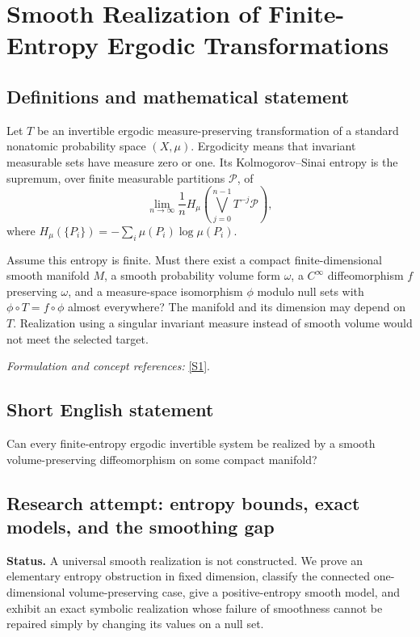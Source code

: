 \documentclass[11pt]{article}
\begin{document}
\section*{\texorpdfstring{Smooth Realization of Finite-Entropy Ergodic Transformations}{Smooth Realization of Finite-Entropy Ergodic Transformations}}\label{455}
\subsection{Definitions and mathematical statement}
Let $T$ be an invertible ergodic measure-preserving transformation of a standard nonatomic probability space $(X,\mu)$. Ergodicity means that invariant measurable sets have measure zero or one. Its Kolmogorov--Sinai entropy is the supremum, over finite measurable partitions $\mathcal P$, of
\[
 \lim_{n\to\infty}\frac1n
 H_\mu\!\left(\bigvee_{j=0}^{n-1}T^{-j}\mathcal P\right),
\]
where $H_\mu(\{P_i\})=-\sum_i\mu(P_i)\log\mu(P_i)$.

Assume this entropy is finite. Must there exist a compact finite-dimensional smooth manifold $M$, a smooth probability volume form $\omega$, a $C^\infty$ diffeomorphism $f$ preserving $\omega$, and a measure-space isomorphism $\phi$ modulo null sets with $\phi\circ T=f\circ\phi$ almost everywhere? The manifold and its dimension may depend on $T$. Realization using a singular invariant measure instead of smooth volume would not meet the selected target.
\par\smallskip\textit{Formulation and concept references:} \href{https://arxiv.org/html/2203.10655}{[S1]}.

\subsection{Short English statement}
Can every finite-entropy ergodic invertible system be realized by a smooth volume-preserving diffeomorphism on some compact manifold?
\subsection{Research attempt: entropy bounds, exact models, and the smoothing gap}
\textbf{Status.} A universal smooth realization is not constructed. We prove an elementary entropy obstruction in fixed dimension, classify the connected one-dimensional volume-preserving case, give a positive-entropy smooth model, and exhibit an exact symbolic realization whose failure of smoothness cannot be repaired simply by changing its values on a null set.
\end{document}
